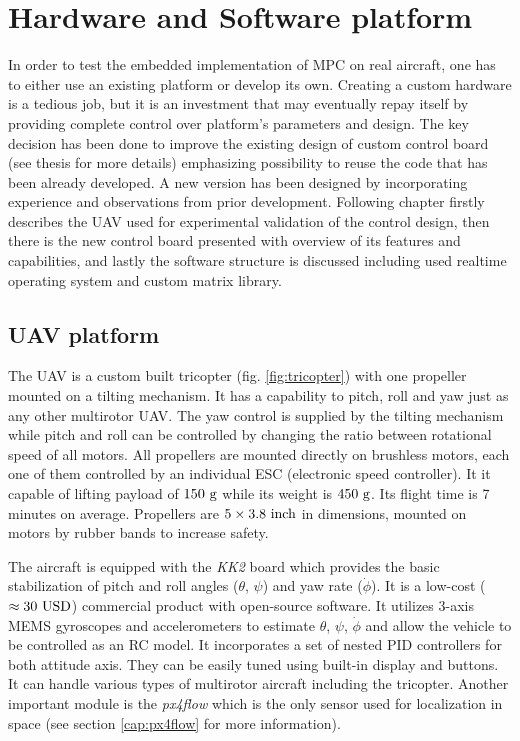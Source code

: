 \section{Hardware and Software platform}

In order to test the embedded implementation of MPC on real aircraft, one has to either use an existing platform or develop its own. Creating a custom hardware is a tedious job, but it is an investment that may eventually repay itself by providing complete control over platform's parameters and design. The key decision has been done to improve the existing design of custom control board (see thesis \citep{baca2013} for more details) emphasizing possibility to reuse the code that has been already developed. A new version has been designed by incorporating experience and observations from prior development. Following chapter firstly describes the UAV used for experimental validation of the control design, then there is the new control board presented with overview of its features and capabilities, and lastly the software structure is discussed including used realtime operating system and custom matrix library.

\subsection{UAV platform}

The UAV is a custom built tricopter (fig. \ref{fig:tricopter}) with one propeller mounted on a tilting mechanism. It has a capability to pitch, roll and yaw just as any other multirotor UAV. The yaw control is supplied by the tilting mechanism while pitch and roll can be controlled by changing the ratio between rotational speed of all motors. All propellers are mounted directly on brushless motors, each one of them controlled by an individual ESC (electronic speed controller). It it capable of lifting payload of $150 ~\mathrm{g}$ while its weight is $450~\mathrm{g}$. Its flight time is 7 minutes on average. Propellers are $5\times3.8 ~\mathrm{inch}$ in dimensions, mounted on motors by rubber bands to increase safety.

The aircraft is equipped with the \textit{KK2} board which provides the basic stabilization of pitch and roll angles ($\theta$, $\psi$) and yaw rate ($\dot{\phi}$). It is a low-cost ($\approx 30~\mathrm{USD}$) commercial product with open-source software. It utilizes 3-axis MEMS gyroscopes and accelerometers to estimate $\theta$, $\psi$, $\dot{\phi}$ and allow the vehicle to be controlled as an RC model. It incorporates a set of nested PID controllers for both attitude axis. They can be easily tuned using built-in display and buttons. It can handle various types of multirotor aircraft including the tricopter. Another important module is the \textit{px4flow} which is the only sensor used for localization in space (see section \ref{cap:px4flow} for more information).

